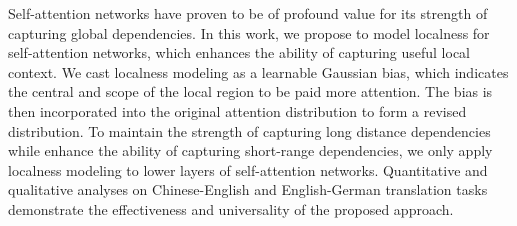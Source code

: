 Self-attention networks have proven to be of profound value for its strength of capturing global dependencies. In this work, we propose to model localness for self-attention networks, which enhances the ability of capturing useful local context. We cast localness modeling as a learnable Gaussian bias, which indicates the central and scope of the local region to be paid more attention. The bias is then incorporated into the original attention distribution to form a revised distribution. To maintain the strength of capturing long distance dependencies while enhance the ability of capturing short-range dependencies, we only apply localness modeling to lower layers of self-attention networks. Quantitative and qualitative analyses on Chinese-English and English-German translation tasks demonstrate the effectiveness and universality of the proposed approach.

